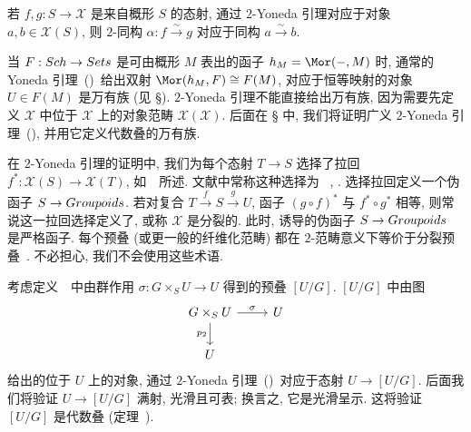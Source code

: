 \begin{remark}\label{src:3.4.23}
若 $f,g:S\to\mathcal X$ 是来自概形 $S$ 的态射, 通过 $2$-Yoneda 引理对应于对象 $a,b\in\mathcal X(S)$, 则 $2$-同构 $\alpha:f\xrightarrow{\sim}g$ 对应于同构 $a\xrightarrow{\sim}b$.
\end{remark}
\begin{remark}[万有族]\label{src:3.4.24}
当 $F:Sch\to Sets$ 是可由概形 $M$ 表出的函子 $h_M=\Mor(-,M)$ 时, 通常的 Yoneda 引理~()~给出双射 $\Mor(h_M,F)\cong F(M)$, 对应于恒等映射的对象 $U\in F(M)$ 是万有族 (见 \S{}). $2$-Yoneda 引理不能直接给出万有族, 因为需要先定义 $\mathcal X$ 中位于 $\mathcal X$ 上的对象范畴 $\mathcal X(\mathcal X)$. 后面在 \S{} 中, 我们将证明广义 $2$-Yoneda 引理~(), 并用它定义代数叠的万有族.
\end{remark}
\begin{remark}[拉回选择与分裂]\label{src:3.4.25}
在 $2$-Yoneda 引理的证明中, 我们为每个态射 $T\to S$ 选择了拉回 $f^*:\mathcal X(S)\to\mathcal X(T)$, 如~\cite[Tag 02XN]{SP}~所述. 文献中常称这种选择为 ~\cite[VI.7]{SGA1}, \cite[定义 $3.9$]{Vis05}. 选择拉回定义一个伪函子 $S\to Groupoids$. 若对复合 $T\xrightarrow{f}S\xrightarrow{g}U$, 函子 $(g\circ f)^*$ 与 $f^*\circ g^*$ 相等, 则常说这一拉回选择定义了, 或称 $\mathcal X$ 是分裂的. 此时, 诱导的伪函子 $S\to Groupoids$ 是严格函子. 每个预叠 (或更一般的纤维化范畴) 都在 $2$-范畴意义下等价于分裂预叠~\cite[Tag 004A]{SP}. 不必担心, 我们不会使用这些术语.
\end{remark}
\begin{example}[商叠的呈示]\label{src:3.4.26}
考虑定义~~中由群作用 $\sigma:G\times_S U\to U$ 得到的预叠 $[U/G]$. $[U/G]$ 中由图
\[
\begin{tikzcd}
G\times_S U\arrow[r,"\sigma"]\arrow[d,"p_2"']&U\\
U&
\end{tikzcd}
\]
给出的位于 $U$ 上的对象, 通过 $2$-Yoneda 引理~()~对应于态射 $U\to[U/G]$. 后面我们将验证 $U\to[U/G]$ 满射, 光滑且可表; 换言之, 它是光滑呈示. 这将验证 $[U/G]$ 是代数叠 (定理~).
\end{example}
